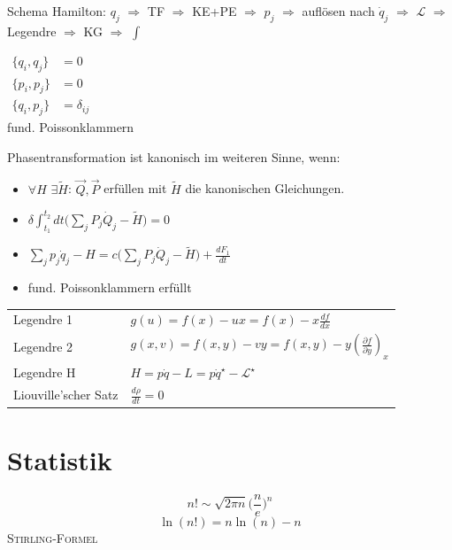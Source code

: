 \documentclass[12pt,a4paper]{article}
\renewcommand{\d}[2]{\frac{d #1}{d #2}}
\newcommand{\pd}[2]{\frac{\partial #1}{\partial #2}}
\renewcommand{\=}[1]{\stackrel{#1}{=}}
\theoremstyle{definition}
\theoremstyle{remark}
\begin{document}
\begin{minipage}[t]{.4\linewidth}
\vspace{0pt}
Schema Hamilton: $q_j$ $\Rightarrow$  TF $\Rightarrow$  KE+PE $\Rightarrow$  $p_j$ $\Rightarrow$  auflösen nach $\dot{q}_j$ $\Rightarrow$  $\mathscr{L}$ $\Rightarrow$  Legendre $\Rightarrow$  KG $\Rightarrow$  $\int$

\begin{framed}
\begin{center}
$\begin{aligned}
\{q_i, q_j\} &= 0 \quad\\
\{p_i, p_j\} &= 0\\
\{q_i, p_j\} &= \delta_{ij}
\end{aligned}$\\
fund. Poissonklammern
\end{center}
\end{framed}

Phasentransformation ist kanonisch im weiteren Sinne, wenn:
\begin{itemize}
\itemsep-0.5em
\item $\forall H$ $\exists \tilde H$: $\vec{Q}, \vec{P}$ erfüllen mit $\tilde H$ die kanonischen Gleichungen.
\item $\delta \displaystyle\int_{t_1}^{t_2} dt \Big( \sum_j P_j \dot{Q}_j - \tilde H \Big)= 0$
\item $\sum_j p_j \dot{q}_j - H = c \Big( \sum_j P_j \dot{Q}_j - \tilde H \Big) + \d{F_1}{t}$
\item fund. Poissonklammern erfüllt
\end{itemize}
\end{minipage}

\noindent\begin{tabular}{ll}
Legendre 1 & $g(u) = f(x) -ux = f(x) - x \d{f}{x}$\\
Legendre 2 & $g(x,v) = f(x,y) - vy = f(x,y) - y (\pd{f}{y})_x$\\
Legendre H & $H = p\dot{q} - L = p \dot{q}^\star-\mathscr{L}^\star$\\
Liouville'scher Satz & $\d{\rho}{t} = 0$\\
\end{tabular}

\newpage
\section{Statistik}

\begin{framed}
$$n! \sim \sqrt{2\pi n} \big(\frac{n}{e}\big)^n$$
$$\ln(n!) = n \ln(n) - n$$
\centering\textsc{Stirling-Formel}
\end{framed}
\end{document}
